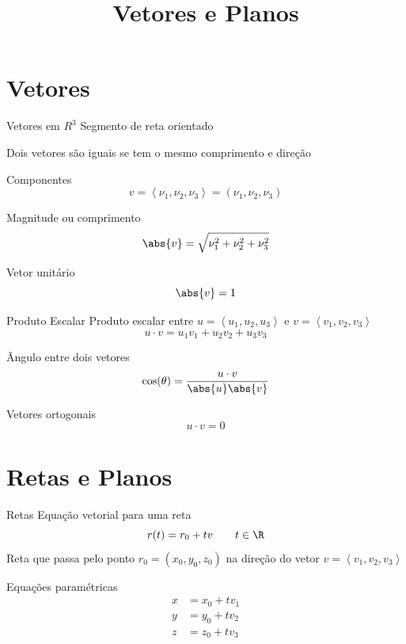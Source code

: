 \documentclass[fleqn,utf8,aspectratio=169,12pt,ignorenonframetext]{beamer}
\title{Vetores e Planos}
\begin{document}
\addtitle

\section{Vetores}

\begin{frame}{Vetores em $R^3$}
  Segmento de reta orientado

  \pause
  Dois vetores são iguais se tem o mesmo comprimento e direção

  \pause
  Componentes
  \[
    v
    = \left< \nu_1, \nu_2, \nu_3 \right>
    = \left( \nu_1, \nu_2, \nu_3 \right)
  \]

  \pause
  Magnitude ou comprimento
  \[
    \abs{v} = \sqrt{\nu_1^2 + \nu_2^2 + \nu_3^2}
  \]

  \pause
  Vetor unitário
  \[
    \abs{v} = 1
  \]
\end{frame}

\begin{frame}{Produto Escalar}
  Produto escalar entre
  \(u=\left<u_1, u_2, u_3\right>\) e
  \(v=\left<v_1, v_2, v_3\right>\)
  \[
    u\cdot v = u_1v_1 + u_2v_2 + u_3v_3
  \]

  \pause
  Ângulo entre dois vetores
  \[
    \cos(\theta) = \frac{u\cdot v}{\abs{u}\abs{v}}
  \]

  \pause
  Vetores ortogonais
  \[
    u\cdot v = 0
  \]
  \end{frame}

\section{Retas e Planos}

\begin{frame}{Retas}
  Equação vetorial para uma reta
  \[
    r(t) = r_0 + tv
    \qquad
    t\in\R
  \]
  Reta que passa pelo ponto \(r_0=\left(x_0, y_0, z_0\right)\)
  na direção do vetor \(v=\left<v_1, v_2, v_3\right>\)

  \pause
  \vspace{\baselineskip}
  Equações paramétricas
  \begin{align*}
    x & = x_0 + tv_1 \\
    y & = y_0 + tv_2 \\
    z & = z_0 + tv_3 \\
  \end{align*}
\end{frame}
\end{document}
